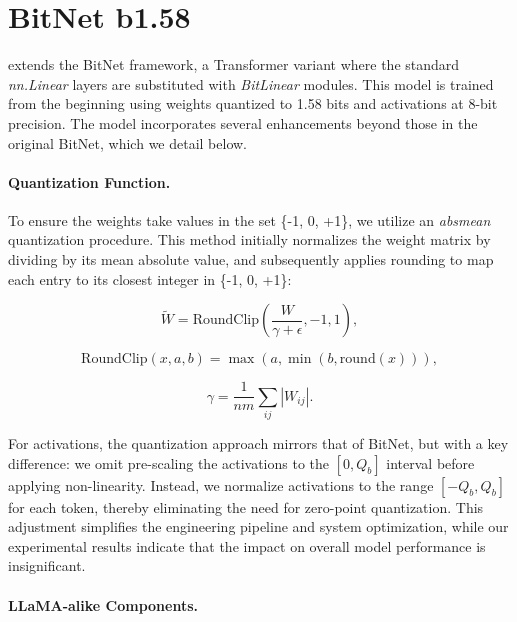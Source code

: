\section{BitNet b1.58}

 extends the BitNet framework, a Transformer variant where the standard \emph{nn.Linear} layers are substituted with \emph{BitLinear} modules. This model is trained from the beginning using weights quantized to 1.58 bits and activations at 8-bit precision. The model incorporates several enhancements beyond those in the original BitNet, which we detail below.

\paragraph{Quantization Function.} To ensure the weights take values in the set \{-1, 0, +1\}, we utilize an \emph{absmean} quantization procedure. This method initially normalizes the weight matrix by dividing by its mean absolute value, and subsequently applies rounding to map each entry to its closest integer in \{-1, 0, +1\}:

\begin{equation}
    \widetilde{W} = \mathrm{RoundClip}(\frac{W}{\gamma + \epsilon}, -1, 1),
\end{equation}

\begin{equation}
    \mathrm{RoundClip}(x, a, b) = \max(a, \min(b, \mathrm{round}(x))),
\end{equation}

\begin{equation}
    \gamma = \frac{1}{nm}\sum_{ij} |W_{ij}|.
\end{equation}

For activations, the quantization approach mirrors that of BitNet, but with a key difference: we omit pre-scaling the activations to the $[0, Q_b]$ interval before applying non-linearity. Instead, we normalize activations to the range $[-Q_b, Q_b]$ for each token, thereby eliminating the need for zero-point quantization. This adjustment simplifies the engineering pipeline and system optimization, while our experimental results indicate that the impact on overall model performance is insignificant.

\paragraph{LLaMA-alike Components.}

